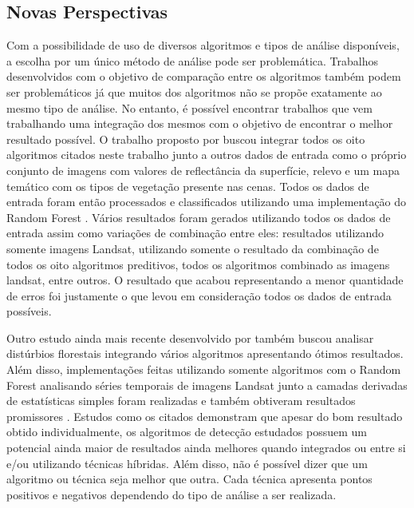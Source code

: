 \documentclass[12pt,a4paper]{article}
\begin{document}
\subsection{Novas Perspectivas}
Com a possibilidade de uso de diversos algoritmos e tipos de análise disponíveis, a escolha por um único método de análise pode ser problemática. Trabalhos desenvolvidos com o objetivo de comparação entre os algoritmos também podem ser problemáticos já que muitos dos algoritmos não se propõe exatamente ao mesmo tipo de análise. No entanto, é possível encontrar trabalhos que vem trabalhando uma integração dos mesmos com o objetivo de encontrar o melhor resultado possível. O trabalho proposto por \citep{HEALEY2018717} buscou integrar todos os oito algoritmos citados neste trabalho junto a outros dados de entrada como o próprio conjunto de imagens com valores de reflectância da superfície, relevo e um mapa temático com os tipos de vegetação presente nas cenas. Todos os dados de entrada foram então processados e classificados utilizando uma implementação do Random Forest \citep{Breiman2001}. Vários resultados foram gerados utilizando todos os dados de entrada assim como variações de combinação entre eles: resultados utilizando somente imagens Landsat, utilizando somente o resultado da combinação de todos os oito algoritmos preditivos, todos os algoritmos combinado as imagens landsat, entre outros. O resultado que acabou representando a menor quantidade de erros foi justamente o que levou em consideração todos os dados de entrada possíveis.

Outro estudo ainda mais recente desenvolvido por \citep{BULLOCK2019111165} também buscou analisar distúrbios florestais integrando vários algoritmos apresentando ótimos resultados. Além disso, implementações feitas utilizando somente algoritmos com o Random Forest analisando séries temporais de imagens Landsat junto a camadas derivadas de estatísticas simples foram realizadas e também obtiveram resultados promissores \citep{WANG2019474}.
Estudos como os citados demonstram que apesar do bom resultado obtido individualmente, os algoritmos de detecção estudados possuem um potencial ainda maior de resultados ainda melhores quando integrados ou entre si e/ou utilizando técnicas híbridas. Além disso, não é possível dizer que um algoritmo ou técnica seja melhor que outra. Cada técnica apresenta pontos positivos e negativos dependendo do tipo de análise a ser realizada.
\end{document}
